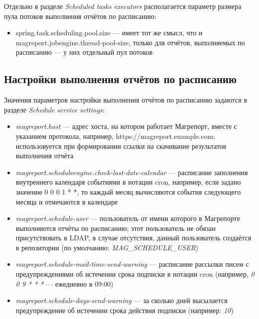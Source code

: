 \documentclass[../user-manual.tex]{subfiles}
\begin{document}
	Отдельно в разделе \textit{Scheduled tasks executors} располагается параметр размера пула потоков выполнения отчётов по расписанию:
	
	\begin{itemize}
		\item spring.task.scheduling.pool.size --- имеет тот же смысл, что и magreport.jobengine.thread-pool-size, только для отчётов, выполняемых по расписанию --- у них отдельный пул потоков
	\end{itemize}
	
	\subsection{Настройки выполнения отчётов по расписанию} \label{subsection:schedule-service-settings}
	
	Значения параметров настройки выполнения отчётов по расписанию задаются в разделе \textit{Schedule service settings}:
	
	\begin{itemize}
		\item \textit{magreport.host} --- адрес хоста, на котором работает Магрепорт, вместе с указанием протокола, например, https://magreport.example.com; использовуется при формировании ссылки на скачивание результатов выполнения отчёта
		
		\item \textit{magreport.scheduleengine.check-last-date-calendar} --- расписание заполнения внутреннего календаря событиями в нотации cron, например, если задано значение 0 0 0 1 * *, то каждый месяц вычисляются события следующего месяца и отмечаются в календаре
		
		\item \textit{magreport.schedule-user} --- пользователь от имени которого в Магрепорте выполняются отчёты по расписанию; этот пользователь не обязан присутствовать в LDAP, в случае отсутствия, данный пользователь создаётся в репозитории (по умолчанию: \textit{MAG\_SCHEDULE\_USER})
		
		\item \textit{magreport.schedule-mail-time-send-warning} --- расписание рассылки писем с предупреждениями об истечении срока подписки в нотации cron (например, \textit{0 0 9 * * *} --- ежедневно в 09:00)
		
		\item \textit{magreport.schedule-days-send-warning} --- за сколько дней высылается предупреждение об истечении срока действия подписки (например: \textit{10})
		
	\end{itemize}
	
\end{document}
